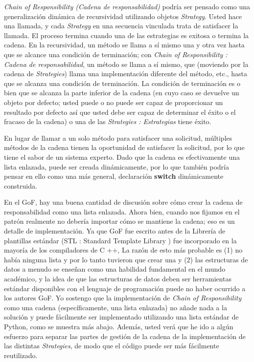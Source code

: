 \textit{Chain of Responsibility (Cadena de responsabilidad)} podría ser pensado como una generalización dinámica de recursividad utilizando objetos \textit{Strategy}. Usted hace una llamada, y cada \textit{Strategy} en una secuencia vinculada trata de satisfacer la llamada. El proceso termina cuando una de las estrategias es exitosa o termina la cadena. En la recursividad, un método se llama a sí mismo una y otra vez hasta que se alcance una condición de terminación; con \textit{Chain of Responsibility : Cadena de responsabilidad}, un método se llama a sí mismo, que (moviendo por la cadena de \textit{Strategies}) llama una implementación diferente del método, etc., hasta que se alcanza una condición de terminación. La condición de terminación es o bien que se alcanza la parte inferior de la cadena (en cuyo caso se devuelve un objeto por defecto; usted puede o no puede ser capaz de proporcionar un resultado por defecto así que usted debe ser capaz de determinar el éxito o el fracaso de la cadena) o una de las \textit{Strategies : Estrategias} tiene éxito.      \newline

En lugar de llamar a un solo método para satisfacer una solicitud, múltiples métodos de la cadena tienen la oportunidad de satisfacer la solicitud, por lo que tiene el sabor de un sistema experto. Dado que la cadena es efectivamente una lista enlazada, puede ser creada dinámicamente, por lo que también podría pensar en ello como una más general, declaración \textbf{switch} dinámicamente construida.   \newline

En el GoF, hay una buena cantidad de discusión sobre cómo crear la cadena de responsabilidad como una lista enlazada. Ahora bien, cuando nos fijamos en el patrón realmente no debería importar cómo se mantiene la cadena; eso es un detalle de implementación. Ya que GoF fue escrito antes de la Librería de plantillas estándar (STL :  Standard Template Library ) fue incorporado en la mayoría de los compiladores de C ++, La razón de esto más probable es (1) no había ninguna lista y por lo tanto tuvieron que crear una y (2) las estructuras de datos a menudo se enseñan como una habilidad fundamental en el mundo académico, y la idea de que las estructuras de datos deben ser herramientas estándar disponibles con el lenguaje de programación puede no haber ocurrido a los autores GoF. Yo sostengo que la implementación de \textit{Chain of Responsibility} como una cadena  (específicamente, una lista enlazada) no añade nada a la solución y puede fácilmente ser implementado utilizando una lista estándar de Python, como se muestra más abajo. Además, usted verá que he ido a algún esfuerzo para separar las partes de gestión de la cadena de la implementación de las distintas \textit{Strategies}, de modo que el código puede ser más fácilmente reutilizado.    \newline

